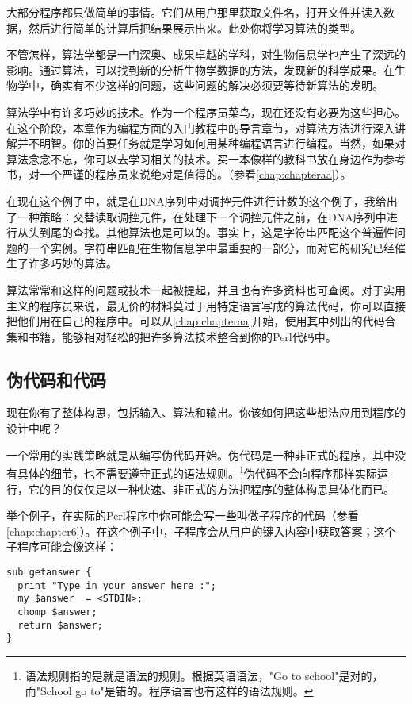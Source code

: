 大部分程序都只做简单的事情。它们从用户那里获取文件名，打开文件并读入数据，然后进行简单的计算后把结果展示出来。此处你将学习算法的类型。

不管怎样，算法学都是一门深奥、成果卓越的学科，对生物信息学也产生了深远的影响。通过算法，可以找到新的分析生物学数据的方法，发现新的科学成果。在生物学中，确实有不少这样的问题，这些问题的解决必须要等待新算法的发明。

算法学中有许多巧妙的技术。作为一个程序员菜鸟，现在还没有必要为这些担心。在这个阶段，本章作为编程方面的入门教程中的导言章节，对算法方法进行深入讲解并不明智。你的首要任务就是学习如何用某种编程语言进行编程。当然，如果对算法念念不忘，你可以去学习相关的技术。买一本像样的教科书放在身边作为参考书，对一个严谨的程序员来说绝对是值得的。（参看\autoref{chap:chapteraa}）。

在现在这个例子中，就是在DNA序列中对调控元件进行计数的这个例子，我给出了一种策略：交替读取调控元件，在处理下一个调控元件之前，在DNA序列中进行从头到尾的查找。其他算法也是可以的。事实上，这是字符串匹配这个普遍性问题的一个实例。字符串匹配在生物信息学中最重要的一部分，而对它的研究已经催生了许多巧妙的算法。

算法常常和这样的问题或技术一起被提起，并且也有许多资料也可查阅。对于实用主义的程序员来说，最无价的材料莫过于用特定语言写成的算法代码，你可以直接把他们用在自己的程序中。可以从\autoref{chap:chapteraa}开始，使用其中列出的代码合集和书籍，能够相对轻松的把许多算法技术整合到你的Perl代码中。

\subsection{伪代码和代码}
现在你有了整体构思，包括输入、算法和输出。你该如何把这些想法应用到程序的设计中呢？

一个常用的实践策略就是从编写伪代码开始。伪代码是一种非正式的程序，其中没有具体的细节，也不需要遵守正式的语法规则。\footnote{语法规则指的是就是语法的规则。根据英语语法，"Go to school"是对的，而"School go to"是错的。程序语言也有这样的语法规则。}伪代码不会向程序那样实际运行，它的目的仅仅是以一种快速、非正式的方法把程序的整体构思具体化而已。

举个例子，在实际的Perl程序中你可能会写一些叫做子程序的代码（参看\autoref{chap:chapter6}）。在这个例子中，子程序会从用户的键入内容中获取答案；这个子程序可能会像这样：

\begin{lstlisting}
sub getanswer {
  print "Type in your answer here :";
  my $answer  = <STDIN>;
  chomp $answer;
  return $answer;
}
\end{lstlisting}

